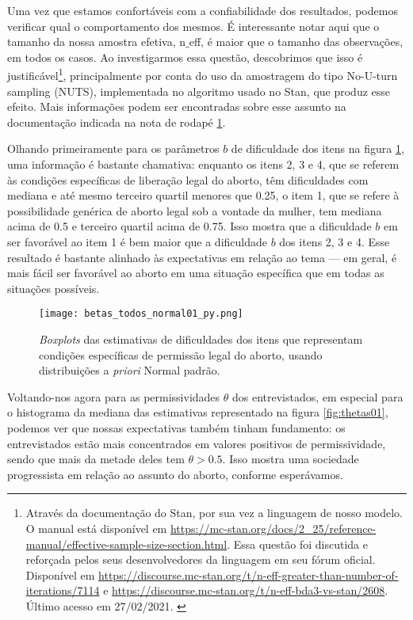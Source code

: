 \documentclass[
	12pt,				%
	openright,			%
	twoside,			%
	a4paper,			%
	english,			%
	brazil				%
	]{abntex2}
\begin{document}
 Uma vez que estamos confortáveis com a confiabilidade dos resultados, podemos verificar qual o comportamento dos mesmos. É interessante notar aqui que o tamanho da nossa amostra efetiva, n$\_$eff, é maior que o tamanho das observações, em todos os casos. Ao investigarmos essa questão, descobrimos que isso é justificável\footnote{Através da documentação do Stan, por sua vez a linguagem de nosso modelo. O manual está disponível em \url{https://mc-stan.org/docs/2_25/reference-manual/effective-sample-size-section.html}. Essa questão foi discutida e reforçada pelos seus desenvolvedores da linguagem em seu fórum oficial. Disponível em \url{https://discourse.mc-stan.org/t/n-eff-greater-than-number-of-iterations/7114} e \url{https://discourse.mc-stan.org/t/n-eff-bda3-vs-stan/2608}. Último acesso em 27/02/2021. \label{notastan}}, principalmente por conta do uso da amostragem do tipo No-U-turn sampling (NUTS), implementada no algoritmo usado no Stan, que produz esse efeito. Mais informações podem ser encontradas sobre esse assunto na documentação indicada na nota de rodapé \ref{notastan}.
 
 Olhando primeiramente para os parâmetros $b$ de dificuldade dos itens na figura \ref{fig:betas01}, uma informação é bastante chamativa: enquanto os itens 2, 3 e 4, que se referem às condições específicas de liberação legal do aborto, têm dificuldades com mediana e até mesmo terceiro quartil menores que 0.25, o item 1, que se refere à possibilidade genérica de aborto legal sob a vontade da mulher, tem mediana acima de 0.5 e terceiro quartil acima de 0.75. Isso mostra que a dificuldade $b$ em ser favorável ao item 1 é bem maior que a dificuldade $b$ dos itens 2, 3 e 4. Esse resultado é bastante alinhado às expectativas em relação ao tema --- em geral, é mais fácil ser favorável ao aborto em uma situação específica que em todas as situações possíveis.
 
 \begin{figure}[!htbp]
    \centering
    \texttt{[image: betas\_todos\_normal01\_py.png]}
    \caption{\textit{Boxplots} das estimativas de dificuldades dos itens que representam condições específicas de permissão legal do aborto, usando distribuições a \textit{priori} Normal padrão.}
    \label{fig:betas01}
 \end{figure}
  \newpage
 Voltando-nos agora para as permissividades $\theta$ dos entrevistados, em especial para o histograma da mediana das estimativas representado na figura \ref{fig:thetas01}, podemos ver que nossas expectativas também tinham fundamento: os entrevistados estão mais concentrados em valores positivos de permissividade, sendo que mais da metade deles tem $\theta > 0.5$. Isso mostra uma sociedade progressista em relação ao assunto do aborto, conforme esperávamos.
 
\end{document}
